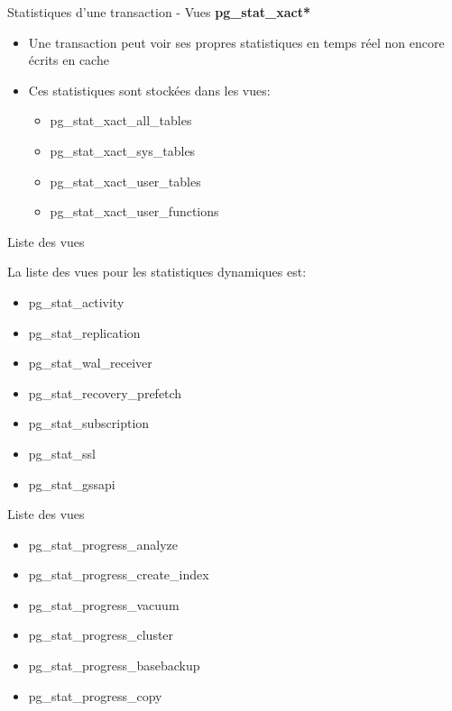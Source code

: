 
\begin{frame}[fragile]{Statistiques d'une transaction - Vues \textbf{pg\_stat\_xact*}}

   \begin{itemize}
      \item Une transaction peut voir ses propres statistiques en temps réel non encore écrits en cache
      \item Ces statistiques sont stockées dans les vues:
      \begin{itemize}
         \item pg\_stat\_xact\_all\_tables
         \item pg\_stat\_xact\_sys\_tables
         \item pg\_stat\_xact\_user\_tables
         \item pg\_stat\_xact\_user\_functions
      \end{itemize}
   \end{itemize}

\end{frame}


\begin{frame}[fragile]{Liste des vues}

   La liste des vues pour les statistiques dynamiques est:
   \begin{itemize}
      \item pg\_stat\_activity
      \item pg\_stat\_replication
      \item pg\_stat\_wal\_receiver
      \item pg\_stat\_recovery\_prefetch
      \item pg\_stat\_subscription
      \item pg\_stat\_ssl
      \item pg\_stat\_gssapi
   \end{itemize}

\end{frame}


\begin{frame}[fragile]{Liste des vues}

   \begin{itemize}
      \item pg\_stat\_progress\_analyze
      \item pg\_stat\_progress\_create\_index
      \item pg\_stat\_progress\_vacuum
      \item pg\_stat\_progress\_cluster
      \item pg\_stat\_progress\_basebackup
      \item pg\_stat\_progress\_copy
   \end{itemize}

\end{frame}

